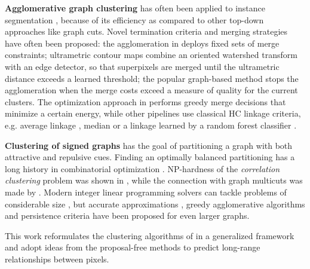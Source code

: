 \textbf{Agglomerative graph clustering} has often been applied to instance segmentation \cite{ren2013image,liu2016image,salembier2000binary}, because of its efficiency as compared to other top-down approaches like graph cuts. 
Novel termination criteria and merging strategies have often been proposed: the agglomeration in \cite{malmberg2011generalized} deploys fixed sets of merge constraints; ultrametric contour maps \cite{arbelaez2011contour} combine an oriented watershed transform with an edge detector, so that superpixels are merged until the ultrametric distance exceeds a learned threshold; the popular graph-based method \cite{felzenszwalb2004efficient} stops the agglomeration when the merge costs exceed a measure of quality for the current clusters. 
The optimization approach in \cite{kiran2014global} performs greedy merge decisions that minimize a certain energy, while other pipelines use classical HC linkage criteria, e.g. average linkage \cite{liu2018affinity,lee2017superhuman}, median \cite{funke2018large} or a linkage learned by a random forest classifier \cite{nunez2013machine,knowles2016rhoananet}.

\textbf{Clustering of signed graphs} has the goal of partitioning a graph with both attractive and repulsive cues. Finding an optimally balanced partitioning has a long history in combinatorial optimization \cite{grotschel1989cutting,grotschel1990facets,chopra1993partition}. %
NP-hardness of the \emph{correlation clustering} problem was shown in \cite{bansal2004correlation}, while the connection with graph multicuts was made by \cite{demaine2006correlation}. Modern integer linear programming solvers can tackle problems of considerable size \cite{andres2012globally}, but accurate approximations \cite{pape2017solving,beier2016efficient,yarkony2012fast}, greedy agglomerative algorithms \cite{levinkov2017comparative,wolf2018mutex,keuper2015efficient,kardoostsolving} and persistence criteria \cite{lange2018partial,lange2018combinatorial} have been proposed for even larger graphs.

This work reformulates the clustering algorithms of \cite{levinkov2017comparative,wolf2018mutex,keuper2015efficient} in a generalized framework and adopt ideas from the proposal-free methods \cite{liu2018affinity,wolf2018mutex,lee2017superhuman} to predict long-range relationships between pixels.
